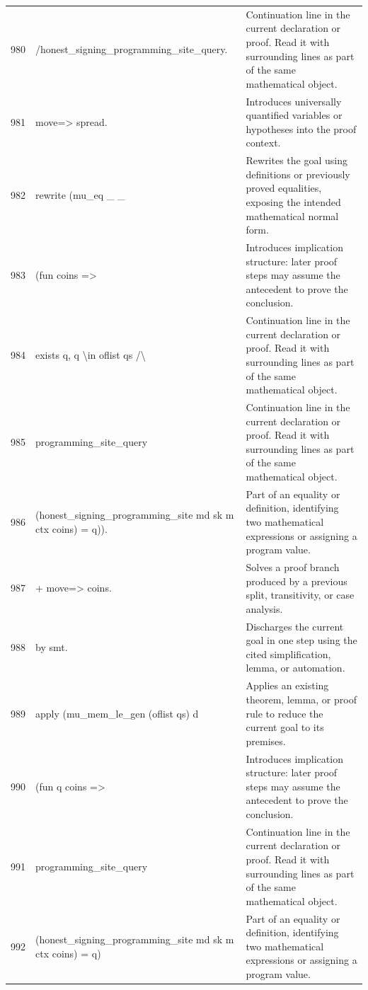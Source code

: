 \documentclass[10pt]{article}
\begin{document}
\begin{longtable}{r L{0.53\textwidth} L{0.37\textwidth}}
980 & {\ttfamily\scriptsize         /honest\_signing\_programming\_site\_query.} & Continuation line in the current declaration or proof.  Read it with surrounding lines as part of the same mathematical object. \\
981 & {\ttfamily\scriptsize move=> spread.} & Introduces universally quantified variables or hypotheses into the proof context. \\
982 & {\ttfamily\scriptsize rewrite (mu\_eq \_ \_} & Rewrites the goal using definitions or previously proved equalities, exposing the intended mathematical normal form. \\
983 & {\ttfamily\scriptsize   (fun coins =>} & Introduces implication structure: later proof steps may assume the antecedent to prove the conclusion. \\
984 & {\ttfamily\scriptsize     exists q, q \textbackslash{}in oflist qs /\textbackslash{}} & Continuation line in the current declaration or proof.  Read it with surrounding lines as part of the same mathematical object. \\
985 & {\ttfamily\scriptsize       programming\_site\_query} & Continuation line in the current declaration or proof.  Read it with surrounding lines as part of the same mathematical object. \\
986 & {\ttfamily\scriptsize         (honest\_signing\_programming\_site md sk m ctx coins) = q)).} & Part of an equality or definition, identifying two mathematical expressions or assigning a program value. \\
987 & {\ttfamily\scriptsize + move=> coins.} & Solves a proof branch produced by a previous split, transitivity, or case analysis. \\
988 & {\ttfamily\scriptsize   by smt.} & Discharges the current goal in one step using the cited simplification, lemma, or automation. \\
989 & {\ttfamily\scriptsize apply (mu\_mem\_le\_gen (oflist qs) d} & Applies an existing theorem, lemma, or proof rule to reduce the current goal to its premises. \\
990 & {\ttfamily\scriptsize         (fun q coins =>} & Introduces implication structure: later proof steps may assume the antecedent to prove the conclusion. \\
991 & {\ttfamily\scriptsize           programming\_site\_query} & Continuation line in the current declaration or proof.  Read it with surrounding lines as part of the same mathematical object. \\
992 & {\ttfamily\scriptsize             (honest\_signing\_programming\_site md sk m ctx coins) = q)} & Part of an equality or definition, identifying two mathematical expressions or assigning a program value. \\

\end{longtable}
\end{document}
